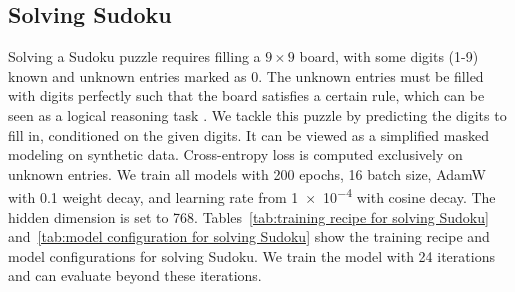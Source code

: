 
\subsection{Solving Sudoku}
\label{section:sudoku setup}
Solving a Sudoku puzzle requires filling a $9\times9$ board, with some digits (1-9) known and unknown entries marked as 0. The unknown entries must be filled with digits perfectly such that the board satisfies a certain rule, which can be seen as a logical reasoning task \citep{wang2019satnet}. We tackle this puzzle by predicting the digits to fill in, conditioned on the given digits. 
It can be viewed as a simplified masked modeling on synthetic data. Cross-entropy loss is computed exclusively on unknown entries. We train all models with 200 epochs, 16 batch size, AdamW \citep{loshchilov2018decoupled} with 0.1 weight decay, and learning rate from \num{1e-4} with cosine decay. The hidden dimension is set to 768. Tables~\ref{tab:training recipe for solving Sudoku} and~\ref{tab:model configuration for solving Sudoku} show the training recipe and model configurations for solving Sudoku. We train the model with 24 iterations and can evaluate beyond these iterations.

